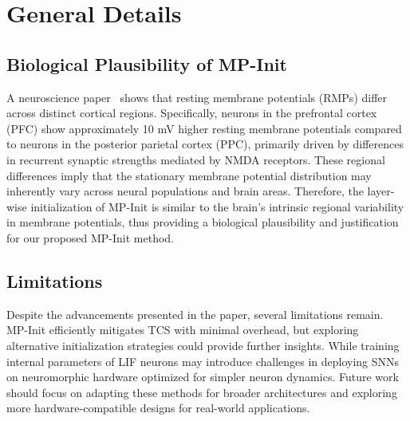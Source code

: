 \clearpage
\maketitlesupplementary

\section{General Details}

\subsection{Biological Plausibility of MP-Init}
A neuroscience paper~\cite{yoo:2023} shows that resting membrane potentials (RMPs) differ across distinct cortical regions. Specifically, neurons in the prefrontal cortex (PFC) show approximately 10 mV higher resting membrane potentials compared to neurons in the posterior parietal cortex (PPC), primarily driven by differences in recurrent synaptic strengths mediated by NMDA receptors. These regional differences imply that the stationary membrane potential distribution may inherently vary across neural populations and brain areas. Therefore, the layer-wise initialization of MP-Init is similar to the brain's intrinsic regional variability in membrane potentials, thus providing a biological plausibility and justification for our proposed MP-Init method.

\subsection{Limitations}
Despite the advancements presented in the paper, several limitations remain. MP-Init efficiently mitigates TCS with minimal overhead, but exploring alternative initialization strategies could provide further insights. While training internal parameters of LIF neurons may introduce challenges in deploying SNNs on neuromorphic hardware optimized for simpler neuron dynamics. Future work should focus on adapting these methods for broader architectures and exploring more hardware-compatible designs for real-world applications. 



